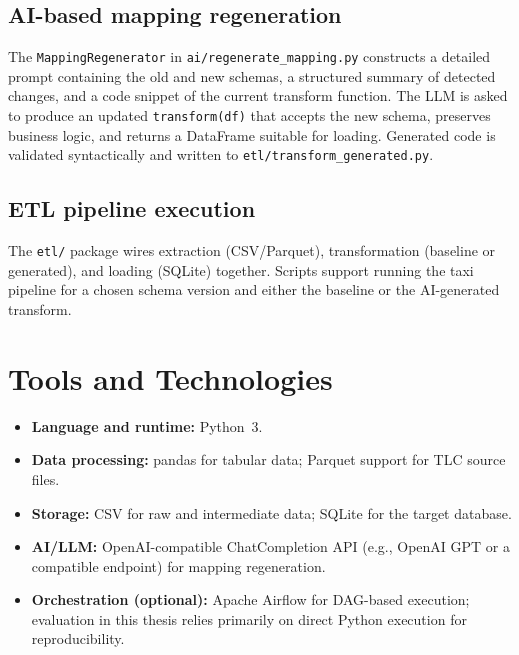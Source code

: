 \subsection{AI-based mapping regeneration}

The \texttt{MappingRegenerator} in \texttt{ai/regenerate\_mapping.py}
constructs a detailed prompt containing the old and new schemas, a structured
summary of detected changes, and a code snippet of the current transform
function. The LLM is asked to produce an updated \texttt{transform(df)} that
accepts the new schema, preserves business logic, and returns a DataFrame
suitable for loading. Generated code is validated syntactically and written to
\texttt{etl/transform\_generated.py}.

\subsection{ETL pipeline execution}

The \texttt{etl/} package wires extraction (CSV/Parquet), transformation
(baseline or generated), and loading (SQLite) together. Scripts support
running the taxi pipeline for a chosen schema version and either the baseline
or the AI-generated transform.

\section{Tools and Technologies}

\begin{itemize}
  \item \textbf{Language and runtime:} Python~3.
  \item \textbf{Data processing:} pandas for tabular data; Parquet support for
  TLC source files.
  \item \textbf{Storage:} CSV for raw and intermediate data; SQLite for the
  target database.
  \item \textbf{AI/LLM:} OpenAI-compatible ChatCompletion API (e.g., OpenAI
  GPT or a compatible endpoint) for mapping regeneration.
  \item \textbf{Orchestration (optional):} Apache Airflow for DAG-based
  execution; evaluation in this thesis relies primarily on direct Python
  execution for reproducibility.
\end{itemize}

